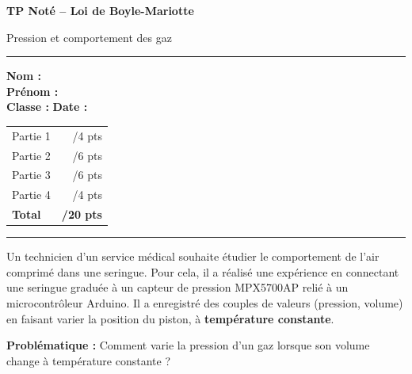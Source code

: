 \documentclass[11pt,a4paper]{article}
\begin{document}
\begin{center}
 \LARGE{\textbf{TP Noté -- Loi de Boyle-Mariotte}}

 \large{Pression et comportement des gaz}
\end{center}

\vspace{3mm}
\hrule
\vspace{4mm}

\begin{minipage}{0.55\linewidth}
    \textbf{Nom :} \dotfill \\[6pt]
    \textbf{Prénom :} \dotfill \\[6pt]
    \textbf{Classe :} \dotfill \hspace{1cm} \textbf{Date :} \dotfill
\end{minipage}
\hfill
\begin{minipage}{0.38\linewidth}
    \begin{baremeBox}
    \begin{center}
    \begin{tabular}{lr}
        Partie 1 & \quad /4 pts \\
        Partie 2 & \quad /6 pts \\
        Partie 3 & \quad /6 pts \\
        Partie 4 & \quad /4 pts \\
        \hline
        \textbf{Total} & \textbf{\quad /20 pts} \\
    \end{tabular}
    \end{center}
    \end{baremeBox}
\end{minipage}

\vspace{5mm}
\hrule
\vspace{5mm}


\begin{contextebox}
Un technicien d'un service médical souhaite étudier le comportement de l'air comprimé dans une seringue. Pour cela, il a réalisé une expérience en connectant une seringue graduée à un capteur de pression MPX5700AP relié à un microcontrôleur Arduino. Il a enregistré des couples de valeurs (pression, volume) en faisant varier la position du piston, à \textbf{température constante}.

\vspace{2mm}
\textbf{Problématique :} Comment varie la pression d'un gaz lorsque son volume change à température constante ?
\end{contextebox}
\end{document}
